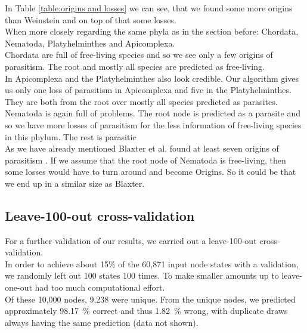         In Table \ref{table:origins and losses} we can see, that we found some more origins than Weinstein 
          and on top of that some losses. \\

        When more closely regarding the same phyla as in the section before: Chordata, Nematoda, 
          Platyhelminthes and Apicomplexa. \\
        Chordata are full of free-living species and so we see only a few origins of parasitism. The root
        and mostly all species are predicted as free-living. \\
        In Apicomplexa and the Platyhelminthes also look credible. Our algorithm gives us only one loss of
          parasitism in Apicomplexa and five in the Platyhelminthes. They are both from the root over
          mostly all species predicted as parasites. \\
        Nematoda is again full of problems. The root node is predicted as a parasite and so we have more 
          losses of parasitism for the less information of free-living species in this phylum. The rest 
          is parasitic \\
        As we have already mentioned Blaxter et al. found at least seven origins of parasitism 
          \cite{Blaxter1998}. If we assume that the root node of Nematoda is free-living, then some 
          losses would have to turn around and become Origins. So it could be that we end up in a similar 
          size as Blaxter.
      
    \subsection{Leave-100-out cross-validation} \label{sec:results - cross-validation}
      For a further validation of our results, we carried out a leave-100-out cross-validation. \\
      In order to achieve about 15\% of the 60,871 input node states with a validation, 
        we randomly left out 100 states 100 times. To make smaller amounts up to leave-one-out had too 
        much computational effort. \\
        
      Of these 10,000 nodes, 9,238 were unique. From the unique nodes, we predicted approximately 
        98.17~\% correct and thus 1.82~\% wrong, with duplicate draws always having the same prediction 
        (data not shown). \\
      
